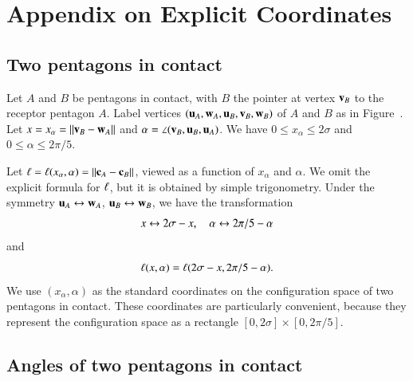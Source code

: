 \appendix
\section{Appendix on Explicit Coordinates}

\subsection{Two pentagons in contact}

Let $A$ and $B$ be pentagons in contact, with $B$ the pointer at
vertex ${\mathbf v}_B$ to the receptor pentagon $A$.  Label vertices
$({\mathbf u}_A,{\mathbf w}_A,{\mathbf u}_B,{\mathbf v}_B,{\mathbf w}_B)$ of $A$ and $B$ as in
Figure~.  Let $x=x_\alpha=\norm{\v_B}{\w_A}$ and $\alpha
= \angle({\mathbf v}_B,{\mathbf u}_B,{\mathbf u}_A)$.  We have $0\le x_\alpha\le 2\sigma$ and
$0\le \alpha\le 2\pi/5$.


Let $\bl = \bl(x_\alpha,\alpha) = \norm{\c_A}{\c_B}$, viewed as a
function of $x_\alpha$ and $\alpha$.  We omit the explicit formula for
$\ell$, but it is obtained by simple trigonometry.  Under the symmetry
${\mathbf u}_A\leftrightarrow {\mathbf w}_A$, ${\mathbf u}_B\leftrightarrow{\mathbf w}_B$, we have the
transformation
\begin{equation}\libel{eqn:sym}
x\leftrightarrow 2\sigma-x,
\quad \alpha\leftrightarrow 2\pi/5-\alpha
\end{equation}
and
\[
\ell(x,\alpha) = \ell(2\sigma-x,2\pi/5 - \alpha).
\]
We use $(x_\alpha,\alpha)$ as the standard coordinates on the
configuration space of two pentagons in contact.  These coordinates
are particularly convenient, because they represent the configuration
space as a rectangle $[0,2\sigma]\times[0,2\pi/5]$.

\subsection{Angles of two pentagons in contact}

